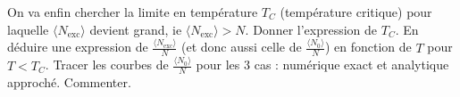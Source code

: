 \question
On va enfin chercher la limite en température $T_C$ (température critique) pour laquelle $\langle N_{\mathrm{exc}} \rangle$ devient grand, ie $\langle N_{\mathrm{exc}} \rangle > N$. Donner l'expression de $T_C$. En déduire une expression de $\frac{\langle N_{\mathrm{exc}} \rangle}{N}$ (et donc aussi celle de $\frac{\langle N_0 \rangle}{N}$) en fonction de $T$ pour $T < T_C$. Tracer les courbes de $\frac{\langle N_0 \rangle}{N}$ pour les 3 cas : numérique exact et analytique approché. Commenter.
